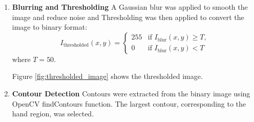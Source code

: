 \begin{enumerate}
    \item \textbf{Blurring and Thresholding}
    A Gaussian blur was applied to smooth the image and reduce noise and Thresholding was then applied to convert the image to binary format:
    \begin{equation}
        I_{\text{thresholded}}(x, y) =
        \begin{cases}
        255 & \text{if } I_{\text{blur}}(x, y) \geq T, \\
        0 & \text{if } I_{\text{blur}}(x, y) < T
        \end{cases}   
    \end{equation} 
    where \( T = 50 \).

    Figure \ref{fig:thresholded_image} shows the thresholded image.

    \item \textbf{Contour Detection}
    Contours were extracted from the binary image using OpenCV findContours function. The largest contour, corresponding to the hand region, was selected. 


\end{enumerate}
